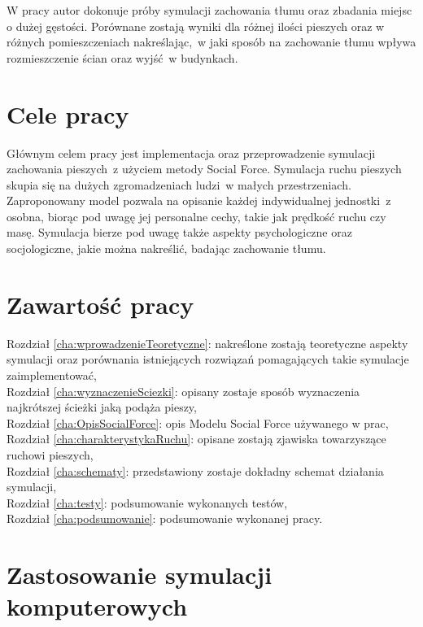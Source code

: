 W pracy autor dokonuje próby symulacji zachowania tłumu oraz zbadania miejsc o dużej gęstości. Porównane zostają wyniki dla różnej ilości pieszych oraz w różnych pomieszczeniach nakreślając,~w jaki sposób na zachowanie tłumu wpływa rozmieszczenie ścian oraz wyjść~w budynkach.



\section{Cele pracy}
\label{sec:celePracy}

Głównym celem pracy jest implementacja oraz przeprowadzenie symulacji zachowania pieszych~z użyciem metody Social Force. Symulacja ruchu pieszych skupia się na dużych zgromadzeniach ludzi~w małych przestrzeniach. Zaproponowany model pozwala na opisanie każdej indywidualnej jednostki~z osobna, biorąc pod uwagę jej personalne cechy, takie jak prędkość ruchu czy masę. Symulacja bierze pod uwagę także aspekty psychologiczne oraz socjologiczne, jakie można nakreślić, badając zachowanie tłumu.


\section{Zawartość pracy}
\label{sec:zawartoscPracy}
Rozdział \ref{cha:wprowadzenieTeoretyczne}: nakreślone zostają teoretyczne aspekty symulacji oraz porównania istniejących rozwiązań pomagających takie symulacje zaimplementować, \\
Rozdział \ref{cha:wyznaczenieSciezki}: opisany zostaje sposób wyznaczenia najkrótszej ścieżki jaką podąża pieszy, \\
Rozdział \ref{cha:OpisSocialForce}: opis Modelu Social Force używanego w prac, \\
Rozdział \ref{cha:charakterystykaRuchu}: opisane zostają zjawiska towarzyszące ruchowi pieszych, \\
Rozdział \ref{cha:schematy}: przedstawiony zostaje dokładny schemat działania symulacji, \\
Rozdział \ref{cha:testy}: podsumowanie wykonanych testów, \\
Rozdział \ref{cha:podsumowanie}: podsumowanie wykonanej pracy. \\


\section{Zastosowanie symulacji komputerowych}
\label{sec:ZastosowanieSymulacji}

